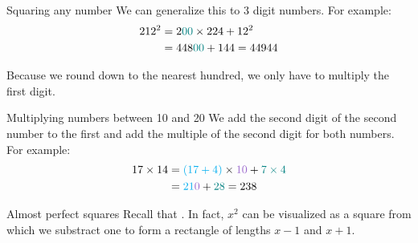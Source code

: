 \documentclass[10pt, french]{article}
\begin{document}
\begin{multicols*}{3}
\begin{CHPT_SUMM}{Squaring any number}
We can generalize this to 3 digit numbers.
For example:
	\begin{align*}
	212^{2}	
	&=	2\textcolor{teal}{00} \times 224 + 12^{2}	\\
	&=	448\textcolor{teal}{00} + 144
	=	44944
	\end{align*}
	
Because we round down to the nearest hundred, we only have to multiply the first digit.
\end{CHPT_SUMM}

\begin{CHPT_SUMM}{Multiplying numbers between 10 and 20}
We add the second digit of the second number to the first and add the multiple of the second digit for both numbers.
For example:
	\begin{align*}
	17 \times 14
	&=	\textcolor{cyan}{(17 + 4)} \times \textcolor{amethyst}{10} + \textcolor{teal}{7 \times 4}	\\
	&=	\textcolor{cyan}{21}\textcolor{amethyst}{0} + \textcolor{teal}{28}	
	=	238
	\end{align*}
\end{CHPT_SUMM}


\begin{CHPT_SUMM}{Almost perfect squares}
Recall that . In fact, $x^{2}$ can be visualized as a square from which we substract one to form a rectangle of lengths $x	-	1$ and $x	+	1$.
\end{CHPT_SUMM}

\end{multicols*}
\end{document}
